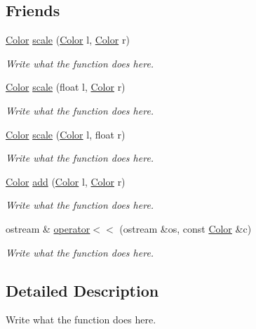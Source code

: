 \subsection*{Friends}
\begin{DoxyCompactItemize}
\item 
\hyperlink{structColor}{Color} \hyperlink{structColor_ac863751b53da826f397a0a3e1791214c}{scale} (\hyperlink{structColor}{Color} l, \hyperlink{structColor}{Color} r)
\begin{DoxyCompactList}\small\item\em Write what the function does here. \end{DoxyCompactList}\item 
\hyperlink{structColor}{Color} \hyperlink{structColor_a3685cef47e27d2bc22e8f4413762af7b}{scale} (float l, \hyperlink{structColor}{Color} r)
\begin{DoxyCompactList}\small\item\em Write what the function does here. \end{DoxyCompactList}\item 
\hyperlink{structColor}{Color} \hyperlink{structColor_a4e134c0253747f92e60466bddd4192f6}{scale} (\hyperlink{structColor}{Color} l, float r)
\begin{DoxyCompactList}\small\item\em Write what the function does here. \end{DoxyCompactList}\item 
\hyperlink{structColor}{Color} \hyperlink{structColor_ae9e42a457d5be803716a51d924225b95}{add} (\hyperlink{structColor}{Color} l, \hyperlink{structColor}{Color} r)
\begin{DoxyCompactList}\small\item\em Write what the function does here. \end{DoxyCompactList}\item 
ostream \& \hyperlink{structColor_a9fbacccb79591c83f4c62d0c65470ac4}{operator$<$$<$} (ostream \&os, const \hyperlink{structColor}{Color} \&c)
\begin{DoxyCompactList}\small\item\em Write what the function does here. \end{DoxyCompactList}\end{DoxyCompactItemize}


\subsection{Detailed Description}
Write what the function does here. 

